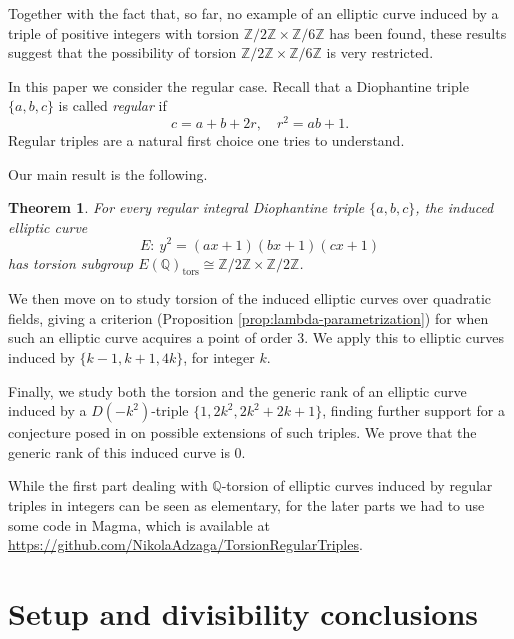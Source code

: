 \documentclass{article}
\theoremstyle{plain}
\newtheorem{theorem}{Theorem}
\newcommand{\Z}{\mathbb{Z}}
\newcommand{\Q}{\mathbb{Q}}
\newcommand{\tors}{\mathrm{tors}}
\begin{document}
Together with the fact that, so far, no example of an elliptic curve induced by a triple of positive integers with torsion $\mathbb{Z}/2\mathbb{Z}\times\mathbb{Z}/6\mathbb{Z}$ has been found, these results suggest that the possibility of torsion $\mathbb{Z}/2\mathbb{Z}\times\mathbb{Z}/6\mathbb{Z}$ is very restricted.

In this paper we consider the regular case. 
Recall that a Diophantine triple \(\{a,b,c\}\) is called \emph{regular} if
\[
c=a+b+2r,\quad r^2=ab+1.
\]
Regular triples are a natural first choice one tries to understand.

Our main result is the following.

\begin{theorem}
For every regular integral Diophantine triple \(\{a,b,c\}\), the induced elliptic curve
\[
E:\ y^2=(ax+1)(bx+1)(cx+1)
\]
has torsion subgroup
\( E(\Q)_{\tors}\cong \Z/2\Z\times \Z/2\Z \).
\end{theorem}




We then move on to study torsion of the induced elliptic curves over quadratic fields, giving a criterion (Proposition \ref{prop:lambda-parametrization}) for when such an elliptic curve acquires a point of order \(3\). We apply this to elliptic curves induced by \( \{k-1, k+1, 4k\} \), for integer \(k \).

Finally, we study both the torsion and the generic rank of an elliptic curve induced by a \(D(-k^2)\)-triple \( \{1, 2k^2, 2k^2+2k+1 \} \), finding further support for a conjecture posed in \cite{AF} on possible extensions of such triples. We prove that the generic rank of this induced curve is \(0\).

While the first part dealing with \(\Q\)-torsion of elliptic curves induced by regular triples in integers can be seen as elementary, for the later parts we had to use some code in Magma, which is available at
\url{https://github.com/NikolaAdzaga/TorsionRegularTriples}.


\section{Setup and divisibility conclusions}
\end{document}
